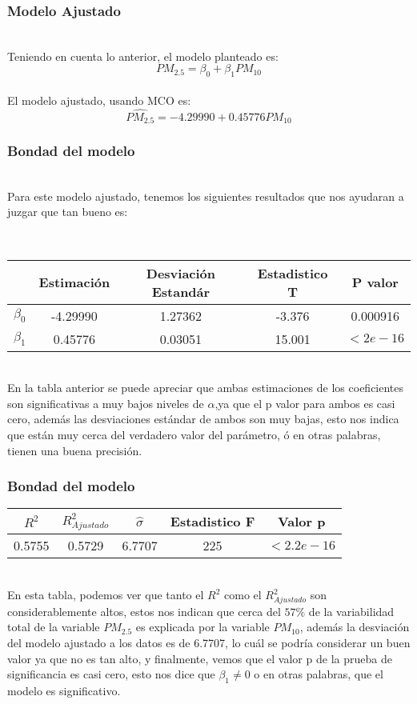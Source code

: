 \documentclass[12pt]{beamer}
\begin{document}
\begin{frame}
\frametitle{Modelo Ajustado}
~\\Teniendo en cuenta lo anterior, el modelo planteado es:
$$PM_{2.5}=\beta_{0}+\beta_{1}PM_{10}$$
~\\El modelo ajustado, usando MCO es:
$$\hat{PM_{2.5}}=-4.29990+0.45776PM_{10}$$
\end{frame}

\begin{frame}
\frametitle{Bondad del modelo}
~\\Para este modelo ajustado, tenemos los siguientes resultados que nos ayudaran a juzgar que tan bueno es:
\begin{center}
~\\\begin{tabular}{|c|c|c|c|c|}
\hline 
 & Estimación & Desviación Estandár & Estadistico T & P valor \\ 
\hline 
$\beta_{0}$ & -4.29990 & 1.27362 & -3.376 & 0.000916 \\ 
\hline 
$\beta_{1}$ & 0.45776 & 0.03051 & 15.001 & $<2e-16$ \\ 
\hline 
\end{tabular} 
\end{center}
~\\En la tabla anterior se puede apreciar que ambas estimaciones de los coeficientes son significativas a muy bajos niveles de $\alpha$,ya que el p valor para ambos es casi cero, además las desviaciones estándar de ambos son muy bajas, esto nos indica que están muy cerca del verdadero valor del parámetro, ó en otras palabras, tienen una buena precisión.
\end{frame}

\begin{frame}
\frametitle{Bondad del modelo}
\begin{center}
\begin{tabular}{|c|c|c|c|c|}
\hline 
$R^2$ & $R^2_{Ajustado}$ & $\hat{\sigma}$ & Estadistico F & Valor p \\ 
\hline 
0.5755 & 0.5729 & 6.7707 & 225 & $<2.2e-16$ \\ 
\hline 
\end{tabular} 
\end{center}
~\\En esta tabla, podemos ver que tanto el $R^2$ como el $R^2_{Ajustado}$ son considerablemente altos, estos nos indican que cerca del $57\%$ de la variabilidad total de la variable $PM_{2.5}$ es explicada por la variable $PM_{10}$, además la desviación del modelo ajustado a los datos es de 6.7707, lo cuál se podría considerar un buen valor ya que no es tan alto, y finalmente, vemos que el valor p de la prueba de significancia es casi cero, esto nos dice que $\beta_{1}\neq 0$ o en otras palabras, que el modelo es significativo.
\end{frame}
\end{document}
